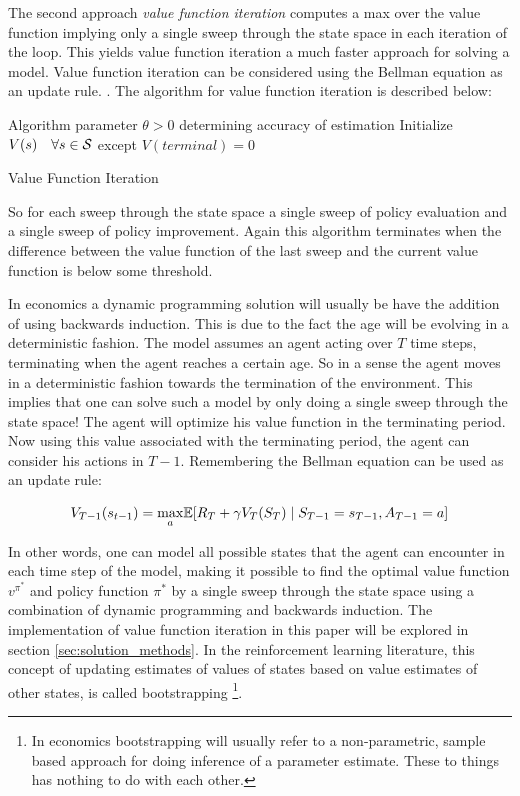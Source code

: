 The second approach \textit{value function iteration} computes a max over the value function implying only a single sweep through the state space in each iteration of the loop. This yields value function iteration a much faster approach for solving a  model. Value function iteration can be considered using the Bellman equation as an update rule. \parencite{sutton_reinforcement_2018}. The algorithm for value function iteration is described below:

\begin{algorithm}[H]
\SetAlgoLined
{}
 Algorithm parameter $\theta > 0$ determining accuracy of estimation\;
 Initialize $V(s)\quad \forall s \in \mathcal{S}$ except $V(terminal) = 0$\;
 \caption{Value Function Iteration}
\end{algorithm}

 So for each sweep through the state space a single sweep of policy evaluation and a single sweep of policy improvement. Again this algorithm terminates when the difference between the value function of the last sweep and the current value function is below some threshold.
 
 In economics a dynamic programming solution will usually be have the addition of using backwards induction. This is due to the fact the age will be evolving in a deterministic fashion. The model assumes an agent acting over $T$ time steps, terminating when the agent reaches a certain age. So in a sense the agent moves in a deterministic fashion towards the termination of the environment. This implies that one can solve such a model by only doing a single sweep through the state space! The agent will optimize his value function in the terminating period. Now using this value associated with the terminating period, the agent can consider his actions in $T-1$. Remembering the Bellman equation can be used as an update rule:
 
 \begin{equation}
     V_{T-1}(s_{t-1}) = \underset{a}{\max}\mathbb{E} [R_T + \gamma V_T (S_T) \mid S_{T-1} = s_{T-1}, A_{T-1} = a]
 \end{equation}
 
 In other words, one can model all possible states that the agent can encounter in each time step of the model, making it possible to find the optimal value function $v^{\pi^*}$ and policy function $\pi^{*}$ by a single sweep through the state space using a combination of dynamic programming and backwards induction. The implementation of value function iteration in this paper will be explored in section \ref{sec:solution_methods}. In the reinforcement learning literature, this concept of updating estimates of values of states based on value estimates of other states, is called bootstrapping \footnote{In economics bootstrapping will usually refer to a non-parametric, sample based approach for doing inference of a parameter estimate. These to things has nothing to do with each other. }. 

